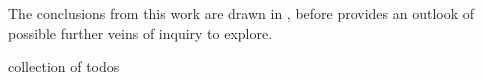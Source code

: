 The conclusions from this work are drawn in , before  provides an outlook of possible further veins of inquiry to explore.


\newpage



collection of todos
